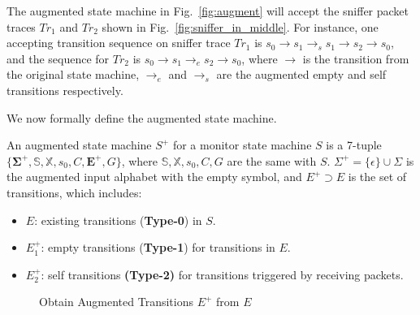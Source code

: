 The augmented state machine in Fig.~\ref{fig:augment} will accept the sniffer
packet traces $Tr_1$ and $Tr_2$ shown in Fig.~\ref{fig:sniffer_in_middle}.  For
instance, one accepting transition sequence on sniffer trace $Tr_1$ is
$s_0\rightarrow s_1 \rightarrow_s s_1\rightarrow s_2 \rightarrow s_0$, and the
sequence for $Tr_2$ is $s_0 \rightarrow s_1 \rightarrow_e s_2 \rightarrow s_0$,
where $\rightarrow$ is the transition from the original state machine,
$\rightarrow_e$ and $\rightarrow_s$ are the augmented empty and self transitions
respectively.

We now formally define the augmented state machine.%
\vspace*{-1mm}
\begin{definition}
  An augmented state machine $S^+$ for a monitor state machine $S$ is a 7-tuple
  $\{\boldsymbol{\Sigma^+}, \mathbb{S}, \mathbb{X}, s_0, C, \boldsymbol{E^+},
  G\}$, where $\mathbb{S}, \mathbb{X}, s_0, C, G$ are the same with $S$.
  $\Sigma^+=\{\epsilon\} \cup \Sigma$ is the augmented input alphabet with the
  empty symbol, and $E^+ \supset E$ is the set of transitions, which includes:
  \vspace*{-1mm}
  \begin{itemize}
    \item $E$: existing transitions (\textbf{Type-0}) in $S$.
    \item $E^+_1$: empty transitions (\textbf{Type-1}) for transitions in $E$.
    \item $E^+_2$: self transitions \textbf{(Type-2)} for transitions
      triggered by receiving packets.
  \end{itemize}
\end{definition}

\begin{figure}[t!]
\begin{algorithm}[H]
  \caption{Obtain Augmented Transitions $E^+$ from $E$}
  \label{alg:augment}
  \begin{algorithmic}[1]
      \label{alg:augment:type0}
      \label{alg:augment:type1}
        \label{alg:augment:type2}
      \EndIf
    \EndFor
    \State {}
    \EndFunction
  \end{algorithmic}
\end{algorithm}
\vspace*{-12mm}
\end{figure}

